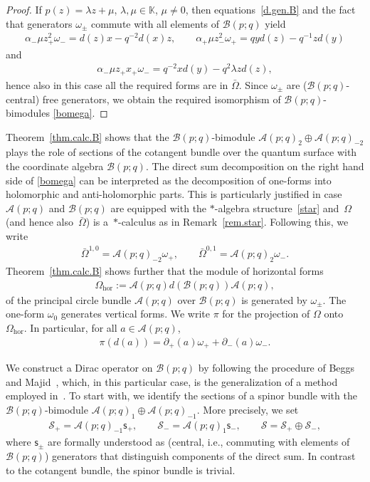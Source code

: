 \documentclass[pdftex]{sigma}
\numberwithin{equation}{section}
\def\Weyl#1#2{{\mathcal{B}}(#1;#2)}
\def\AWeyl#1#2{{\mathcal{A}}(#1;#2)}
\begin{document}
\begin{proof}
If $p(z) = \lambda z +\mu$, $\lambda, \mu\in {\mathbb K}$, $\mu\neq 0$, then equations~\eqref{d.gen.B} and the fact that generators $\omega_\pm$ commute with all elements of $\Weyl p q$ yield
\begin{gather*}
\alpha_-\mu z_+^2\omega_- = d(z) x - q^{-2}d(x)z, \qquad \alpha_+\mu z_-^2\omega_+ = qyd(z) - q^{-1}z d(y)
\end{gather*}
and
\begin{gather*}
\alpha_-\mu z_+x_+\omega_- = q^{-2}x d(y) - q^2 \lambda z d(z),
\end{gather*}
hence also in this case all the required forms are in $\bar{\Omega}$.
Since $\omega_\pm$ are ($\Weyl p q$-central) free generators, we obtain the required isomorphism of $\Weyl p q$-bimodules \eqref{bomega}.
\end{proof}

Theorem~\ref{thm.calc.B} shows that the $\Weyl p q$-bimodule $\AWeyl p q_{2} \oplus \AWeyl p q_{-2}$ plays the role of sections of the cotangent bundle over the quantum surface with the coordinate algebra $\Weyl p q$. The direct sum decomposition on the right hand side of \eqref{bomega} can be interpreted as the decomposition of one-forms into holomorphic and anti-holomorphic parts. This is particularly justif\/ied in case~$\AWeyl p q$ and $\Weyl p q$ are equipped with the $*$-algebra structure~\eqref{star} and~$\Omega$ (and hence also~$\bar\Omega$) is a~$*$-calculus as in Remark~\ref{rem.star}. Following this, we write
\begin{gather*}
\bar\Omega^{1,0} = \AWeyl p q _{-2} \omega_+, \qquad \bar\Omega^{0,1} = \AWeyl p q _{2} \omega_-.
\end{gather*}
Theorem~\ref{thm.calc.B} shows further that the module of horizontal forms
\begin{gather*}
\Omega_{\mathrm{hor}} := \AWeyl p q d (\Weyl p q ) \AWeyl p q,
\end{gather*}
of the principal circle bundle $\AWeyl p q$ over $\Weyl p q$ is generated by $\omega_\pm$. The one-form $\omega_0$ generates vertical forms. We write $\pi$ for the projection of $\Omega$ onto $\Omega_{\mathrm{hor}}$. In particular, for all $a\in \AWeyl p q$,
\begin{gather*}%
\pi(d(a)) = \partial_+(a)\omega_+ + \partial_-(a)\omega_-.
\end{gather*}

We construct a Dirac operator on $\Weyl p q$ by following the procedure of Beggs and Majid~\cite{BegMaj:spe}, which, in this particular case, is the generalization of a method employed in~\cite{Maj:Rie}. To start with, we identify the sections of a spinor bundle with the $\Weyl p q$-bimodule
$\AWeyl p q_{1} \oplus \AWeyl p q_{-1}$. More precisely, we set
\begin{gather}\label{spinor}
\mathcal{S}_+ = \AWeyl p q_{-1}{\mathsf{s}}_+, \qquad \mathcal{S}_- = \AWeyl p q_{1}{\mathsf{s}}_-, \qquad \mathcal{S} = \mathcal{S}_+\oplus \mathcal{S}_-,
\end{gather}
where ${\mathsf{s}}_\pm$ are formally understood as (central, i.e., commuting with elements of $\Weyl p q$) generators that distinguish components of the direct sum. In contrast to the cotangent bundle, the spinor bundle is trivial.
\end{document}
